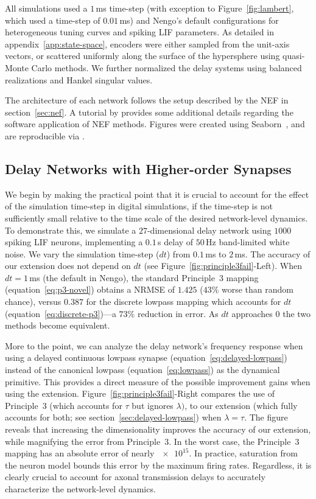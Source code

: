 \documentclass[12pt]{article}
\theoremstyle{definition}
\begin{document}
All simulations used a $1$\,ms time-step (with exception to Figure~\ref{fig:lambert}, which used a time-step of $0.01$\,ms) and Nengo's default configurations for heterogeneous tuning curves and spiking LIF parameters.
As detailed in appendix~\ref{app:state-space},
encoders were either sampled from the unit-axis vectors, or scattered uniformly along the surface of the hypersphere using quasi-Monte Carlo methods.
We further normalized the delay systems using balanced realizations and Hankel singular values.

The architecture of each network follows the setup described by the NEF in section~\ref{sec:nef}.
A tutorial by \citet{sharma2016} provides some additional details regarding the software application of NEF methods.
Figures were created using Seaborn~\citep{michael_waskom_2015_19108}, and are reproducible via .

\subsection{Delay Networks with Higher-order Synapses}
\label{sec:pure_delay}

We begin by making the practical point that it is crucial to account for the effect of the simulation time-step in digital simulations, if the time-step is not sufficiently small relative to the time scale of the desired network-level dynamics.
To demonstrate this, we simulate a $27$-dimensional delay network using $\num{1000}$ spiking LIF neurons, implementing a $0.1$\,s delay of $50$\,Hz band-limited white noise.
We vary the simulation time-step ($dt$) from $0.1$\,ms to $2$\,ms.
The accuracy of our extension does not depend on $dt$ (see Figure~\ref{fig:principle3fail}-Left).
When $dt=1$\,ms (the default in Nengo), the standard Principle~3 mapping (equation~\ref{eq:p3-novel}) obtains a NRMSE of $1.425$ ($43\%$ worse than random chance), versus $0.387$ for the discrete lowpass mapping which accounts for $dt$ (equation~\ref{eq:discrete-p3})---a $73\%$ reduction in error.
As $dt$ approaches $0$ the two methods become equivalent.

More to the point, we can analyze the delay network's frequency response
when using a delayed continuous lowpass synapse (equation~\ref{eq:delayed-lowpass}) instead of the canonical lowpass (equation~\ref{eq:lowpass}) as the dynamical primitive.
This provides a direct measure of the possible improvement gains when using the extension.
Figure~\ref{fig:principle3fail}-Right compares the use of Principle~3 (which accounts for $\tau$ but ignores $\lambda)$, to our extension (which fully accounts for both; see section~\ref{sec:delayed-lowpass}) when $\lambda = \tau$.
The figure reveals that increasing the dimensionality improves the accuracy of our extension, while magnifying the error from Principle~3.
In the worst case, the Principle~3 mapping has an absolute error of nearly $\num{e15}$.
In practice, saturation from the neuron model bounds this error by the maximum firing rates.
Regardless, it is clearly crucial to account for axonal transmission delays to accurately characterize the network-level dynamics.
\end{document}
